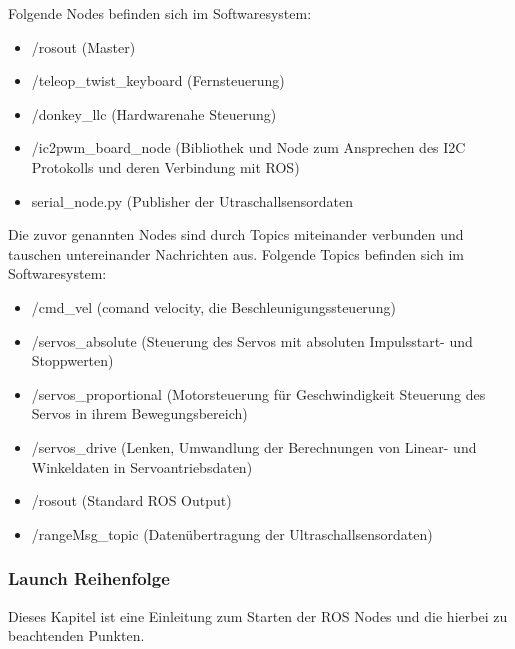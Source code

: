 \documentclass[conference]{IEEEtran}
\begin{document}
	Folgende Nodes befinden sich im Softwaresystem:
	\begin{itemize}
		\item /rosout (Master)
		\item /teleop\_twist\_keyboard (Fernsteuerung)
		\item /donkey\_llc (Hardwarenahe Steuerung)
		\item /ic2pwm\_board\_node (Bibliothek und Node zum Ansprechen des I2C Protokolls und deren Verbindung mit ROS)
		\item serial\_node.py (Publisher der Utraschallsensordaten
	\end{itemize}
	
	Die zuvor genannten Nodes sind durch Topics miteinander verbunden und tauschen untereinander Nachrichten aus. Folgende Topics befinden sich im Softwaresystem:
	\begin{itemize}
		\item /cmd\_vel (comand velocity, die Beschleunigungssteuerung)
		\item /servos\_absolute (Steuerung des Servos mit absoluten Impulsstart- und Stoppwerten)
		\item /servos\_proportional (Motorsteuerung für Geschwindigkeit Steuerung des Servos in ihrem Bewegungsbereich)
		\item /servos\_drive (Lenken, Umwandlung der Berechnungen von Linear- und Winkeldaten in Servoantriebsdaten)
		\item /rosout (Standard ROS Output)
		\item /rangeMsg\_topic (Datenübertragung der Ultraschallsensordaten)
	\end{itemize}
	
	\pagebreak
	\subsubsection{Launch Reihenfolge}%
	
	Dieses Kapitel ist eine Einleitung zum Starten der ROS Nodes und die hierbei zu beachtenden Punkten.
	
\end{document}

